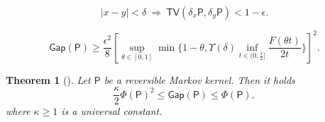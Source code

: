 \documentclass[10pt,a4paper]{amsart}
\newtheorem{thm}{Theorem}
\newcommand{\Gap}{\mathsf{Gap}}
\newcommand{\Rectbrac}[1]{\left[#1\right]}
\newcommand{\St}{\Rightarrow}
\newcommand{\TV}{\mathsf{TV}}
\newcommand{\norme}[1]{\left|#1\right|}
\newcommand{\sfP}{\mathsf{P}}
\begin{document}
    \begin{equation}
    \label{eqn:CloseCouple}
        \norme{ x-y } < \delta ~\St~ \TV (\delta_x \sfP,\delta_y \sfP) < 1-\epsilon .
    \end{equation}

\begin{equation}
\label{eqn:SpecGap_via_Iso}
    \Gap(\sfP) \ge \frac{\epsilon^2}{8} \Rectbrac{ \sup_{\theta\in[0,1]} \min \Big\{ 1-\theta , \Upsilon(\delta) \inf_{t\in(0,\frac{1}{2}]} \frac{ F(\theta t) }{ 2t } \Big\} }^2.
\end{equation}

\begin{thm}[\cite{MR930082}]
\label{thm:ChIneq}
Let $\sfP$ be a reversible Markov kernel. Then it holds
\begin{equation}
\label{eqn:ChIneq}
    \frac{\kappa}{2} \Phi(\sfP)^2 \le \Gap(\sfP) \le \Phi(\sfP),
\end{equation}
where $\kappa \ge 1$ is a universal constant.
\end{thm}
\end{document}
